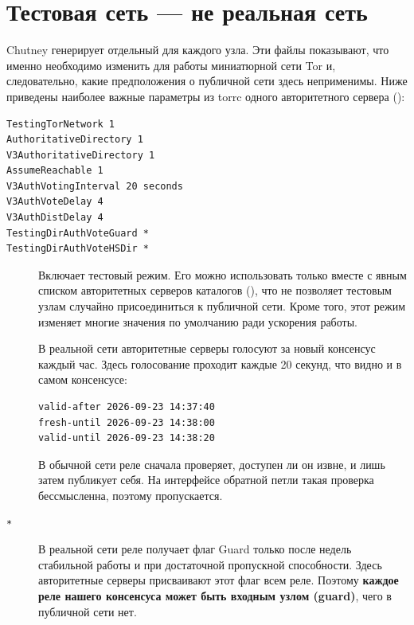 \section{Тестовая сеть — не реальная сеть}\label{sec:rp-opzioni}

Chutney генерирует отдельный  для каждого узла. Эти файлы показывают, что именно необходимо изменить для работы миниатюрной сети Tor и, следовательно, какие предположения о публичной сети здесь неприменимы. Ниже приведены наиболее важные параметры из torrc одного авторитетного сервера ():
\begin{lstlisting}[language=torrc,numbers=none]
TestingTorNetwork 1
AuthoritativeDirectory 1
V3AuthoritativeDirectory 1
AssumeReachable 1
V3AuthVotingInterval 20 seconds
V3AuthVoteDelay 4
V3AuthDistDelay 4
TestingDirAuthVoteGuard *
TestingDirAuthVoteHSDir *
\end{lstlisting}

\begin{description}
  \item[] Включает тестовый режим. Его можно использовать только вместе с явным списком авторитетных серверов каталогов (), что не позволяет тестовым узлам случайно присоединиться к публичной сети. Кроме того, этот режим изменяет многие значения по умолчанию ради ускорения работы.
  \item[] В реальной сети авторитетные серверы голосуют за новый консенсус каждый час. Здесь голосование проходит каждые 20 секунд, что видно и в самом консенсусе:
\begin{lstlisting}[numbers=none]
valid-after 2026-09-23 14:37:40
fresh-until 2026-09-23 14:38:00
valid-until 2026-09-23 14:38:20
\end{lstlisting}
  \item[] В обычной сети реле сначала проверяет, доступен ли он извне, и лишь затем публикует себя. На интерфейсе обратной петли такая проверка бессмысленна, поэтому пропускается.
  \item[ \texttt{*}] В реальной сети реле получает флаг Guard только после недель стабильной работы и при достаточной пропускной способности. Здесь авторитетные серверы присваивают этот флаг всем реле. Поэтому \textbf{каждое реле нашего консенсуса может быть входным узлом (guard)}, чего в публичной сети нет.
\end{description}


